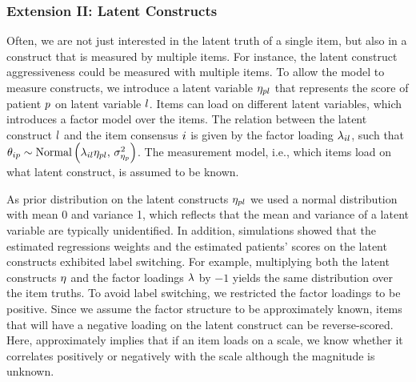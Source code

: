\documentclass[a4paper,usenames,dvipsnames]{article}
\newenvironment{revision}{\color{teal}}{\color{black}}
\begin{document}
\subsubsection*{Extension II: Latent Constructs}
Often, we are not just interested in the latent truth of a single item, but also in a construct that is measured by multiple items. For instance, the latent construct aggressiveness could be measured with multiple items. To allow the model to measure constructs, we introduce a latent variable $\eta_{pl}$ that represents the score of patient $p$ on latent variable $l$. Items can load on different latent variables, which introduces a factor model over the items. The relation between the latent construct $l$ and the item consensus $i$ is given by the factor loading $\lambda_{il}$, such that $\theta_{ip} \sim \text{Normal}\left(\lambda_{il}\eta_{pl},\,\sigma^2_{\eta_{p}}\right)$. The measurement model, i.e., which items load on what latent construct, is assumed to be known.

As prior distribution on the latent constructs $\eta_{pl}$ we used a normal distribution with mean 0 and variance 1, which reflects that the mean and variance of a latent variable are typically  unidentified. In addition, simulations showed that the estimated regressions weights and the estimated patients' scores on the latent constructs exhibited label switching. For example, multiplying both the latent constructs $\eta$ and the factor loadings $\lambda$ by $-1$ yields the same distribution over the item truths. To avoid label switching, we restricted the factor loadings to be positive. Since we assume the factor structure to be approximately known, items that will have a negative loading on the latent construct can \begin{revision}be\end{revision} reverse-scored. Here, approximately implies that if an item loads on a scale, we know whether it correlates positively or negatively with the scale although the magnitude is unknown.
\end{document}
